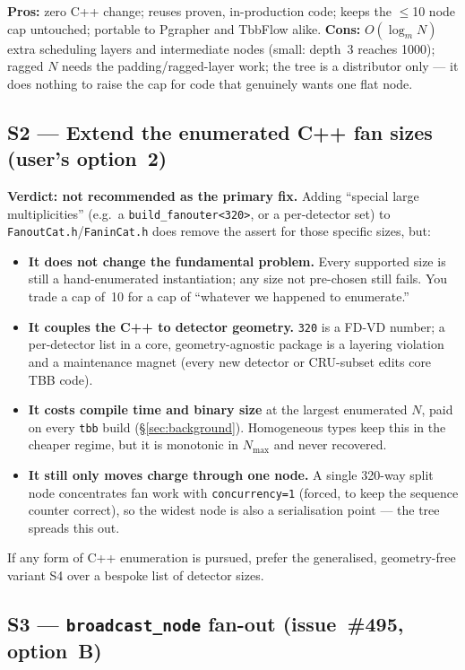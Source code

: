 \documentclass[11pt]{article}
\newcommand{\code}[1]{\texttt{#1}}
\newcommand{\file}[1]{\texttt{\small #1}}
\begin{document}
\noindent
\textbf{Pros:} zero C++ change; reuses proven, in-production code; keeps the
$\le$10 node cap untouched; portable to Pgrapher and TbbFlow alike.
\textbf{Cons:} $O(\log_m N)$ extra scheduling layers and intermediate nodes
(small: depth~3 reaches 1000); ragged $N$ needs the padding/ragged-layer work;
the tree is a distributor only --- it does nothing to raise the cap for code that
genuinely wants one flat node.

\subsection{S2 --- Extend the enumerated C++ fan sizes (user's option~2)}

\textbf{Verdict: not recommended as the primary fix.}  Adding
``special large multiplicities'' (e.g.\ a \code{build\_fanouter<320>}, or a
per-detector set) to \file{FanoutCat.h}/\file{FaninCat.h} does remove the assert
for those specific sizes, but:

\begin{itemize}
\item \textbf{It does not change the fundamental problem.}  Every supported size
  is still a hand-enumerated instantiation; any size not pre-chosen still fails.
  You trade a cap of~10 for a cap of ``whatever we happened to enumerate.''
\item \textbf{It couples the C++ to detector geometry.}  \code{320} is a FD-VD
  number; a per-detector list in a core, geometry-agnostic package is a layering
  violation and a maintenance magnet (every new detector or CRU-subset edits
  core TBB code).
\item \textbf{It costs compile time and binary size} at the largest enumerated
  $N$, paid on every \code{tbb} build (\S\ref{sec:background}).  Homogeneous
  types keep this in the cheaper regime, but it is monotonic in $N_{\max}$ and
  never recovered.
\item \textbf{It still only moves charge through one node.}  A single 320-way
  split node concentrates fan work with \code{concurrency=1} (forced, to keep the
  sequence counter correct), so the widest node is also a serialisation point ---
  the tree spreads this out.
\end{itemize}

\noindent
If any form of C++ enumeration is pursued, prefer the generalised, geometry-free
variant S4 over a bespoke list of detector sizes.

\subsection{S3 --- \code{broadcast\_node} fan-out (issue~\#495, option~B)}
\end{document}
